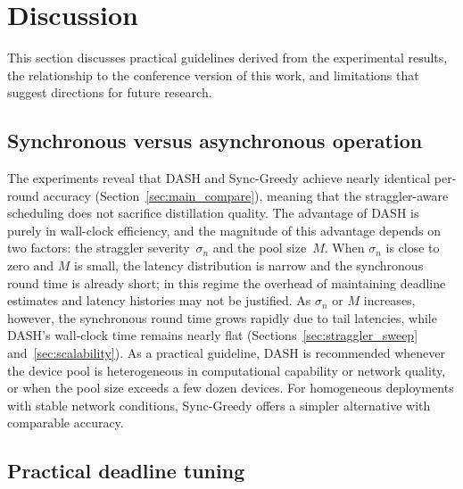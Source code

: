 \documentclass[a4paper,fleqn]{cas-dc}
\begin{document}
	\section{Discussion}\label{sec:discuss}
	
	This section discusses practical guidelines derived from the
	experimental results, the relationship to the conference version of
	this work, and limitations that suggest directions for future
	research.
	
	\subsection{Synchronous versus asynchronous operation}\label{sec:sync_vs_async}
	
	The experiments reveal that DASH and Sync-Greedy achieve nearly
	identical per-round accuracy (Section~\ref{sec:main_compare}),
	meaning that the straggler-aware scheduling does not sacrifice
	distillation quality.  The advantage of DASH is purely in wall-clock
	efficiency, and the magnitude of this advantage depends on two
	factors: the straggler severity~$\sigma_n$ and the pool size~$M$.
	When $\sigma_n$ is close to zero and $M$ is small, the latency
	distribution is narrow and the synchronous round time is already
	short; in this regime the overhead of maintaining deadline estimates
	and latency histories may not be justified.  As $\sigma_n$ or $M$
	increases, however, the synchronous round time grows rapidly due to
	tail latencies, while DASH's wall-clock time remains nearly flat
	(Sections~\ref{sec:straggler_sweep} and~\ref{sec:scalability}).  As
	a practical guideline, DASH is recommended whenever the device pool
	is heterogeneous in computational capability or network quality, or
	when the pool size exceeds a few dozen devices.  For homogeneous
	deployments with stable network conditions, Sync-Greedy offers a
	simpler alternative with comparable accuracy.
	
	\subsection{Practical deadline tuning}\label{sec:deadline_tuning}
	
\end{document}
